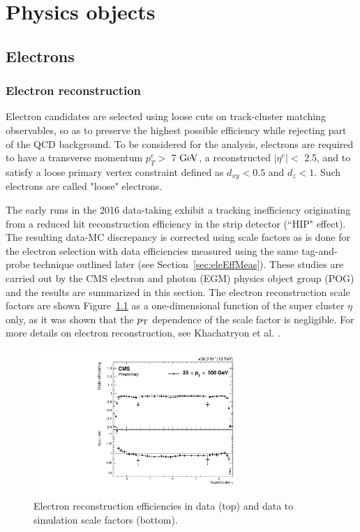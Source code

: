 \chapter{Physics objects}\label{sec:objects}

\section{Electrons}

\subsection{Electron reconstruction}
\label{sec:eleReco}


Electron candidates are selected using loose cuts on track-cluster matching observables, so as to preserve the highest possible efficiency while rejecting part of the QCD background. To be considered for the analysis, electrons are required to have a
transverse momentum $p^e_T >$ 7 $\mathrm{Ge\kern -0.1em V}$, a reconstructed $|\eta^e| <$ 2.5, and to satisfy a loose primary vertex 
constraint defined as $d_{xy} < 0.5$ and $d_z < 1$. 
Such electrons are called "loose" electrons.

The early runs in the 2016 data-taking exhibit a tracking inefficiency originating from a reduced hit reconstruction efficiency in the strip detector (``HIP" effect). 
The resulting data-MC discrepancy is corrected using scale factors as is done for the electron selection with data efficiencies measured using the same tag-and-probe technique outlined later (see Section~\ref{sec:eleEffMeas}). 
These studies are carried out by the CMS electron and photon (EGM) physics object group (POG) and the results are summarized in this section.
The electron reconstruction scale factors are shown Figure~\ref{fig:ele_rec_scale_factors} as a one-dimensional function of the super cluster $\eta$ only, as it was shown that the $p_{\rm{T}}$ dependence of the scale factor is negligible. For more details on electron reconstruction, see Khachatryon et al. \cite{ElectronLegacy}. 

\begin{figure}[!htb]
\vspace*{0.3cm}
\begin{center}
\includegraphics[width=0.7\textwidth]{Figures/Electrons/ele_rec_scale_factors.pdf}
\end{center}
\caption{Electron reconstruction efficiencies in data (top) and data to simulation scale factors (bottom).}
\label{fig:ele_rec_scale_factors}
\end{figure}

